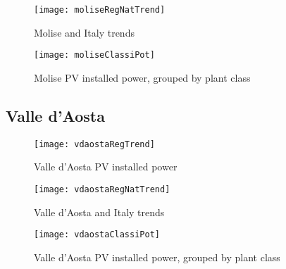 \documentclass[12pt,a4paper,openright,twoside]{report}
\begin{document}
\begin{figure}[hp]
	\centering
	\texttt{[image: moliseRegNatTrend]}
	\caption{Molise and Italy trends}
	\label{moliseRegNatTrend}
\end{figure}

\begin{figure}[hp]
	\centering
	\texttt{[image: moliseClassiPot]}
	\caption{Molise PV installed power, grouped by plant class}
	\label{moliseClassiPot}
\end{figure}

\subsection*{Valle d'Aosta}

\begin{figure}[hp]
	\centering
	\texttt{[image: vdaostaRegTrend]}
	\caption{Valle d'Aosta PV installed power}
	\label{vdaostaRegTrend}
\end{figure}

\begin{figure}[hp]
	\centering
	\texttt{[image: vdaostaRegNatTrend]}
	\caption{Valle d'Aosta and Italy trends}
	\label{vdaostaRegNatTrend}
\end{figure}

\begin{figure}[hp]
	\centering
	\texttt{[image: vdaostaClassiPot]}
	\caption{Valle d'Aosta PV installed power, grouped by plant class}
	\label{vdaostaClassiPot}
\end{figure}
\end{document}
